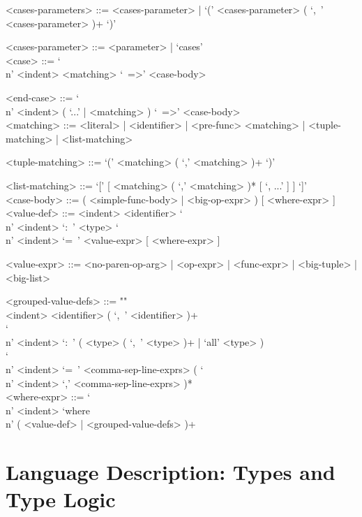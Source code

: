 \documentclass{article}
\begin{document}
\begin{grammar}
<cases-parameters> ::=
<cases-parameter> | `(' <cases-parameter> ( `,\ ' <cases-parameter> )+ `)'

<cases-parameter> ::= <parameter> | `cases' \\

<case> ::=  `\\n' <indent> <matching> `\ =>' <case-body>

<end-case> ::=
`\\n' <indent> ( `...' | <matching> ) `\ =>' <case-body>\\

<matching> ::= 
<literal> | <identifier> | <pre-func> <matching> | <tuple-matching> |
<list-matching>

<tuple-matching> ::= `(' <matching> ( `,' <matching> )+ `)'

<list-matching> ::= `[' [ <matching> ( `,' <matching> )* [ `, ...' ] ] `]' \\

<case-body> ::=
( <simple-func-body> | <big-op-expr> ) [ <where-expr> ]\\

<value-def> ::= 
<indent> <identifier> 
`\\n' <indent> `:\ ' <type> 
`\\n' <indent> `=\ ' <value-expr> [ <where-expr> ]

<value-expr> ::=
<no-paren-op-arg> | <op-expr> | <func-expr> | <big-tuple> | <big-list>

<grouped-value-defs> ::= ""\\
<indent> <identifier> ( `,\ ' <identifier> )+ \\
`\\n' <indent> `:\ ' ( <type> ( `,\ ' <type> )+ | `all' <type> ) \\
`\\n' <indent> `=\ '
<comma-sep-line-exprs> ( `\\n' <indent> `,' <comma-sep-line-exprs> )* \\

<where-expr> ::=
`\\n' <indent> `where\\n' ( <value-def> | <grouped-value-defs> )+ \\
\end{grammar}

\section{Language Description: Types and Type Logic}
\end{document}
